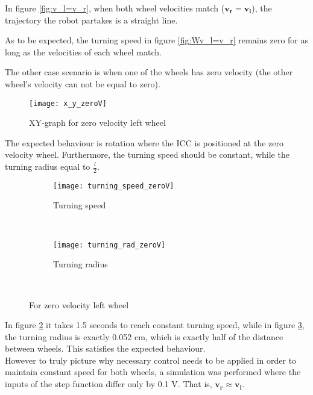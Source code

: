 In figure \ref{fig:v_l=v_r}, when both wheel velocities match ($\boldsymbol{v_r = v_l}$), the trajectory the robot partakes is a straight line. 

As to be expected, the turning speed in figure \ref{fig:Wv_l=v_r} remains zero for as long as the velocities of each wheel match.

\newpage

The other case scenario is when one of the wheels has zero velocity (the other wheel's velocity can not be equal to zero).

\begin{figure}[h]
\centering
\texttt{[image: x\_y\_zeroV]}
\caption{XY-graph for zero velocity left wheel}
\label{fig::ZeroV}
\end{figure} 

The expected behaviour is rotation where the ICC is positioned at the zero velocity wheel. Furthermore, the turning speed should be constant, while the turning radius equal to $\frac{l}{2}$.

\begin{figure}[h]
    \centering
    \begin{subfigure}[h]{0.47\textwidth}
        \texttt{[image: turning\_speed\_zeroV]}
        \caption{Turning speed}
        \label{fig:TzeroV}
    \end{subfigure}
    ~ %
    \begin{subfigure}[h]{0.47\textwidth}
        \texttt{[image: turning\_rad\_zeroV]}
        \caption{Turning radius}
        \label{fig:RzeroV}
    \end{subfigure}
    ~ %
    \caption{For zero velocity left wheel}\label{fig:zeroV}
\end{figure}

In figure \ref{fig:TzeroV} it takes 1.5 seconds to reach constant turning speed, while in figure \ref{fig:RzeroV}, the turning radius is exactly 0.052 cm, which is exactly half of the distance between wheels. This satisfies the expected behaviour. \\


However to truly picture why necessary control needs to be applied in order to maintain constant speed for both wheels, a simulation was performed where the inputs of the step function differ only by 0.1 V. That is, $\boldsymbol{v_r \approx v_l}$. 


